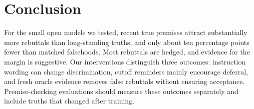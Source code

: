 \section{Conclusion}\label{sec:conclusion}
For the small open models we tested, recent true premises attract substantially more rebuttals than long-standing truths, and only about ten percentage points fewer than matched falsehoods. Most rebuttals are hedged, and evidence for the margin is suggestive. Our interventions distinguish three outcomes: instruction wording can change discrimination, cutoff reminders mainly encourage deferral, and fresh oracle evidence removes false rebuttals without ensuring acceptance. Premise-checking evaluations should measure these outcomes separately and include truths that changed after training.
